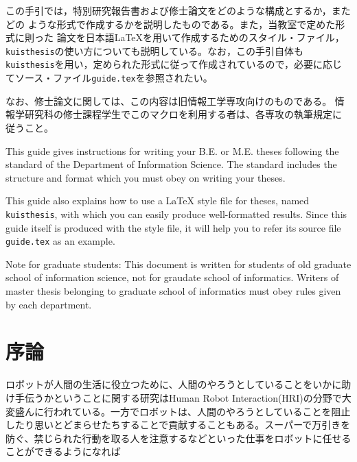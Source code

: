 \documentclass{kuisthesis}
\date{平成31年2月8日}				%
\begin{document}
\maketitle

\begin{jabstract}				%
この手引では，特別研究報告書および修士論文をどのような構成とするか，またどの
ような形式で作成するかを説明したものである。また，当教室で定めた形式に則った
論文を日本語\LaTeX を用いて作成するためのスタイル・ファイル，
\verb|kuisthesis|の使い方についても説明している。なお，この手引自体も
\verb|kuisthesis|を用い，定められた形式に従って作成されているので，必要に応じ
てソース・ファイル\verb|guide.tex|を参照されたい。

なお、修士論文に関しては、この内容は旧情報工学専攻向けのものである。
情報学研究科の修士課程学生でこのマクロを利用する者は、各専攻の執筆規定に
従うこと。
\end{jabstract}

\begin{eabstract}				%
This guide gives instructions for writing your B.E. or M.E. theses following
the standard of the Department of Information Science.  The
standard includes the structure and format which you must obey on writing
your theses.

This guide also explains how to use a \LaTeX{} style file for theses, named
\verb|kuisthesis|, with which you can easily produce well-formatted results.
Since this guide itself is produced with the style file, it will help you to
refer its source file \verb|guide.tex| as an example.

Note for graduate students: This document is written for students of
old graduate school of information science, not for graudate school of
informatics. Writers of master thesis belonging to graduate school
of informatics must obey rules given by each department.
\end{eabstract}

\tableofcontents






\section{序論}

ロボットが人間の生活に役立つために、人間のやろうとしていることをいかに助け手伝うかということに関する研究はHuman Robot Interaction(HRI)の分野で大変盛んに行われている。一方でロボットは、人間のやろうとしていることを阻止したり思いとどまらせたちすることで貢献することもある。スーパーで万引きを防ぐ、禁じられた行動を取る人を注意するなどといった仕事をロボットに任せることができるようになれば
\end{document}
